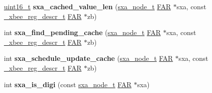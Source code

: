 \begin{DoxyCompactItemize}
\item 
\mbox{\label{group___s_x_a_ga7795a6e72cb0489fdc2910d235d320ab}} 
\hyperlink{group__hal__dos_ga5a8b2dc9e45a9ee81a94ef304fb62505}{uint16\+\_\+t} {\bfseries sxa\+\_\+cached\+\_\+value\+\_\+len} (\hyperlink{structsxa__node__t}{sxa\+\_\+node\+\_\+t} \hyperlink{group__hal_gaef060b3456fdcc093a7210a762d5f2ed}{F\+AR} $\ast$sxa, const \hyperlink{struct__xbee__reg__descr__t}{\+\_\+xbee\+\_\+reg\+\_\+descr\+\_\+t} \hyperlink{group__hal_gaef060b3456fdcc093a7210a762d5f2ed}{F\+AR} $\ast$zb)
\item 
\mbox{\label{group___s_x_a_ga77e16624f969e20d1c39a468d783a5ea}} 
int {\bfseries sxa\+\_\+find\+\_\+pending\+\_\+cache} (\hyperlink{structsxa__node__t}{sxa\+\_\+node\+\_\+t} \hyperlink{group__hal_gaef060b3456fdcc093a7210a762d5f2ed}{F\+AR} $\ast$sxa, const \hyperlink{struct__xbee__reg__descr__t}{\+\_\+xbee\+\_\+reg\+\_\+descr\+\_\+t} \hyperlink{group__hal_gaef060b3456fdcc093a7210a762d5f2ed}{F\+AR} $\ast$zb)
\item 
\mbox{\label{group___s_x_a_gaa85363be4aaec395e0702bffe9fd737a}} 
int {\bfseries sxa\+\_\+schedule\+\_\+update\+\_\+cache} (\hyperlink{structsxa__node__t}{sxa\+\_\+node\+\_\+t} \hyperlink{group__hal_gaef060b3456fdcc093a7210a762d5f2ed}{F\+AR} $\ast$sxa, const \hyperlink{struct__xbee__reg__descr__t}{\+\_\+xbee\+\_\+reg\+\_\+descr\+\_\+t} \hyperlink{group__hal_gaef060b3456fdcc093a7210a762d5f2ed}{F\+AR} $\ast$zb)
\item 
\mbox{\label{group___s_x_a_ga4e69849f1bd4c5261fd1185506a96b01}} 
int {\bfseries sxa\+\_\+is\+\_\+digi} (const \hyperlink{structsxa__node__t}{sxa\+\_\+node\+\_\+t} \hyperlink{group__hal_gaef060b3456fdcc093a7210a762d5f2ed}{F\+AR} $\ast$sxa)
\end{DoxyCompactItemize}
